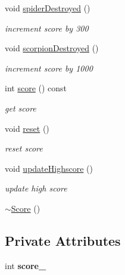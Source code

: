 \begin{DoxyCompactItemize}
void \mbox{\hyperlink{class_score_af89eeb4b0f9bab8100515d8a64d02ce2}{spider\+Destroyed}} ()
\begin{DoxyCompactList}\small\item\em increment score by 300 \end{DoxyCompactList}\item 
\mbox{\label{class_score_a24e57ed23fb84aaa07226b1bf118bcc7}} 
void \mbox{\hyperlink{class_score_a24e57ed23fb84aaa07226b1bf118bcc7}{scorpion\+Destroyed}} ()
\begin{DoxyCompactList}\small\item\em increment score by 1000 \end{DoxyCompactList}\item 
int \mbox{\hyperlink{class_score_a4df9075ea876a3b9c09d933f3c5ebee8}{score}} () const
\begin{DoxyCompactList}\small\item\em get score \end{DoxyCompactList}\item 
\mbox{\label{class_score_a32804ba9a847e58160e6e0cef46e1f25}} 
void \mbox{\hyperlink{class_score_a32804ba9a847e58160e6e0cef46e1f25}{reset}} ()
\begin{DoxyCompactList}\small\item\em reset score \end{DoxyCompactList}\item 
\mbox{\label{class_score_a6302d15ed9a796f3916320d42c90cd38}} 
void \mbox{\hyperlink{class_score_a6302d15ed9a796f3916320d42c90cd38}{update\+Highscore}} ()
\begin{DoxyCompactList}\small\item\em update high score \end{DoxyCompactList}\item 
\mbox{\hyperlink{class_score_a54ab36a6fdd88696f0176d9534a76883}{$\sim$\+Score}} ()
\end{DoxyCompactItemize}
\subsection*{Private Attributes}
\begin{DoxyCompactItemize}
\item 
\mbox{\label{class_score_acaeda7737ddfbd4401adf960d3975d74}} 
int {\bfseries score\+\_\+}
\end{DoxyCompactItemize}


